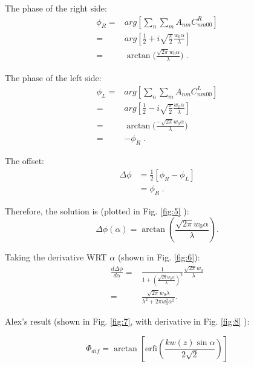 \documentclass[aps,twoside,secnumarabic,balancelastpage,amsmath,amssymb,nofootinbib,hyperref=pdftex]{revtex4}
\newcommand{\bigfrac}[2]{\Big( \frac{#1}{#2}\Big)}
\begin{document}
The phase of the right side:
\begin{align*}
\phi_R =& arg \left[ \sum_{n} \sum_{m} A_{nm} C_{nm00}^{R} \right]
\\=&
	arg
	\left[
		\frac{1}{2}
		+
		i  \sqrt{\frac{\pi}{2}}
		\frac{ w_{0} \alpha}{\lambda}
	\right]
\\=&
	\arctan
		\bigfrac{
		 \sqrt{2 \pi} w_{0} \alpha}{ 			\lambda}
\;.
\end{align*}
	
The phase of the left side:
\begin{align*}
\phi_L =& arg \left[ \sum_{n} \sum_{m} A_{nm} C_{nm00}^{L} \right]
\\=&
	arg
	\left[
		\frac{1}{2}
		-
		i  \sqrt{\frac{\pi}{2}}
		\frac{ w_{0} \alpha}{\lambda}
	\right]
\\=&
	\arctan
		\bigfrac{-
		 \sqrt{2 \pi} w_{0} \alpha}{ 			\lambda}
\\=&
-\phi_R
\;.
\end{align*}

The offset:
\begin{align*}
\Delta \phi &= \frac{1}{2} \left[ \phi_R - \phi_L \right]
\\&=
\phi_R
\;.
\end{align*}

Therefore, the solution is (plotted in Fig. \ref{fig:5} ):
\begin{equation} \Delta \phi(\alpha) =  \arctan (\frac{\sqrt{2 \pi} w_{0} \alpha}{\lambda}).
\end{equation}



Taking the derivative WRT $\alpha$ (shown in Fig. \ref{fig:6}):
\begin{align}
\frac{d \Delta \phi}{d \alpha}  
=&
\frac{1}{1+(\frac{\sqrt{2 \pi} w_{0} \alpha}{\lambda})^2}\frac{\sqrt{2 \pi} w_{0}}{\lambda}
\\=&
\frac{\sqrt{2 \pi}w_0 \lambda}{\lambda^2+2 \pi w_0^2 \alpha^2}.
\end{align}



Alex's result (shown in Fig. \ref{fig:7}, with derivative in Fig. \ref{fig:8} ):

\begin{equation}
\Phi_{dif} = \arctan \left[ \text{erfi}(\frac{kw(z) \sin \alpha}{2 \sqrt{2}}) \right] 
\end{equation}	

\clearpage
\end{document}
